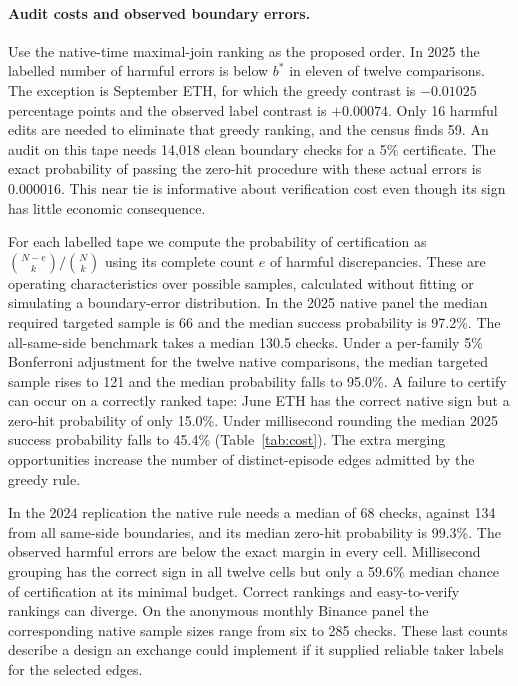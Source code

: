 \paragraph{Audit costs and observed boundary errors.}
Use the native-time maximal-join ranking as the proposed order. In 2025 the labelled number of harmful errors is below $b^*$ in eleven of twelve comparisons. The exception is September ETH, for which the greedy contrast is $-0.01025$ percentage points and the observed label contrast is $+0.00074$. Only 16 harmful edits are needed to eliminate that greedy ranking, and the census finds 59. An audit on this tape needs 14,018 clean boundary checks for a 5\% certificate. The exact probability of passing the zero-hit procedure with these actual errors is $0.000016$. This near tie is informative about verification cost even though its sign has little economic consequence.

For each labelled tape we compute the probability of certification as $\binom{N-e}{k}/\binom{N}{k}$ using its complete count $e$ of harmful discrepancies. These are operating characteristics over possible samples, calculated without fitting or simulating a boundary-error distribution. In the 2025 native panel the median required targeted sample is 66 and the median success probability is 97.2\%. The all-same-side benchmark takes a median 130.5 checks. Under a per-family 5\% Bonferroni adjustment for the twelve native comparisons, the median targeted sample rises to 121 and the median probability falls to 95.0\%. A failure to certify can occur on a correctly ranked tape: June ETH has the correct native sign but a zero-hit probability of only 15.0\%. Under millisecond rounding the median 2025 success probability falls to 45.4\% (Table~\ref{tab:cost}). The extra merging opportunities increase the number of distinct-episode edges admitted by the greedy rule.

In the 2024 replication the native rule needs a median of 68 checks, against 134 from all same-side boundaries, and its median zero-hit probability is 99.3\%. The observed harmful errors are below the exact margin in every cell. Millisecond grouping has the correct sign in all twelve cells but only a 59.6\% median chance of certification at its minimal budget. Correct rankings and easy-to-verify rankings can diverge. On the anonymous monthly Binance panel the corresponding native sample sizes range from six to 285 checks. These last counts describe a design an exchange could implement if it supplied reliable taker labels for the selected edges.

